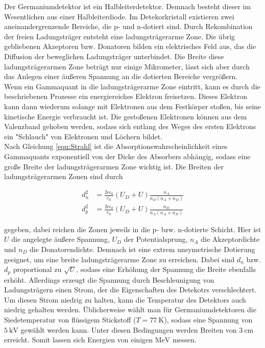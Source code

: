 Der Germaniumdetektor ist ein Halbleiterdetektor. Demnach besteht dieser im Wesentlichen aus einer Halbleiterdiode. Im Detekorkristall 
existieren zwei aneinandergrenzende Bereiche, die p- und n-dotiert sind. Durch Rekombination der freien Ladungsträger entsteht eine ladungsträgerarme 
Zone. Die übrig gebliebenen Akzeptoren bzw. Donatoren bilden ein elektrisches Feld aus, das die Diffusion der beweglichen Ladungsträger unterbindet. 
Die Breite diese ladungsträgerarmen Zone beträgt nur einige Mikrometer, lässt sich aber durch das Anlegen einer äußeren Spannung an die dotierten 
Bereiche vergrößern. \\
Wenn ein Gammaquant in die ladungsträgerarme Zone eintritt, kann es durch die beschriebenen Prozesse ein energiereiches Elektron freisetzen. Dieses Elektron
kann dann wiederum solange mit Elektronen aus dem Festkörper stoßen, bis seine kinetische Energie verbraucht ist. Die gestoßenen Elektronen können 
aus dem Valenzband gehoben werden, sodass sich entlang des Weges des ersten Elektrons ein "Schlauch" von Elektronen und Löchern bildet.\\
Nach Gleichung \eqref{eqn:Strahl} ist die Absorptionswahrscheinlichkeit eines Gammaquants exponentiell von der Dicke des Absorbers abhängig, 
sodass eine große Breite der ladungsträgerarmen Zone wichtig ist. Die Breiten der ladungsträgerarmen Zonen sind durch 

\begin{align}
    d_n^2 &= \frac{2\epsilon\epsilon_0}{e_0}\left(U_D+U\right)\frac{n_A}{n_D\left(n_A+n_D\right)}\\
    d_p^2 &= \frac{2\epsilon\epsilon_0}{e_0}\left(U_D+U\right)\frac{n_D}{n_A\left(n_A+n_D\right)}
\end{align}

gegeben, dabei reichen die Zonen jeweils in die p- bzw. n-dotierte Schicht. Hier ist $U$ die angelegte äußere Spannung, $U_D$ der Potentialsprung, $n_A$ die 
Akzeptordichte und $n_D$ die Donatorendichte. Demnach ist eine extrem unsymetrische Dotierung geeignet, um eine 
breite ladungsträgerarme Zone zu erreichen. Dabei sind $d_n$ bzw. $d_p$ proportional zu $\sqrt{U}$, sodass eine Erhöhung der Spannung die Breite 
ebenfalls erhöht. Allerdings erzeugt die Spannung durch Beschleunigung von Ladungsträgern einen Strom, der die Eigenschaften des Detekotrs 
verschlechtert. Um diesen Strom niedrig zu halten, kann die Temperatur des Detektors auch niedrig gehalten werden. Üblicherweise wählt man 
für Germaniumdetektoren die Siedetemperatur von flüssigem Stickstoff ($T=\SI{77}{\kelvin}$), sodass eine Spannung von $\SI{5}{\kilo\volt}$
gewählt werden kann. Unter diesen Bedingungen werden Breiten von $\SI{3}{\centi\meter}$ erreicht. Somit lassen sich Energien von einigen $\si{\mega\eV}$
messen.  
  
